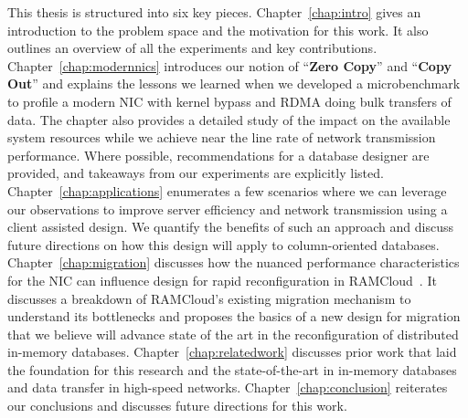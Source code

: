 This thesis is structured into six key pieces. 
Chapter~\ref{chap:intro} gives an introduction to the problem space and the motivation for this work. 
It also outlines an overview of all the experiments and key contributions. Chapter~\ref{chap:modernnics} introduces 
our notion of \enquote{\textbf{Zero Copy}} and \enquote{\textbf{Copy Out}} and explains 
the lessons we learned when we developed a microbenchmark to profile a modern NIC with kernel bypass and RDMA doing bulk transfers 
of data. The chapter also provides a detailed study of the impact on the available system resources while we achieve 
near the line rate of network transmission performance. Where possible, \linebreak recommendations for a database designer are provided, and takeaways 
from our \linebreak experiments are explicitly listed. Chapter~\ref{chap:applications} enumerates a few scenarios where we can 
leverage our observations to improve server efficiency and network transmission using a client assisted design.
 We quantify the benefits of such an approach and discuss \linebreak future directions on how this design will apply to column-oriented 
 databases. \linebreak Chapter~\ref{chap:migration} discusses how the nuanced performance characteristics for the NIC can \linebreak influence 
design for rapid reconfiguration in RAMCloud~\cite{ramcloud}. It discusses a breakdown of RAMCloud's existing migration mechanism to understand its bottlenecks
and proposes the basics of a new design for migration that we believe will advance state of the art
in the reconfiguration of distributed in-memory databases. Chapter~\ref{chap:relatedwork} discusses prior work that laid the 
foundation for this research and the state-of-the-art in in-memory databases and data transfer in high-speed networks. 
Chapter~\ref{chap:conclusion} reiterates our conclusions and discusses future directions for this work.

